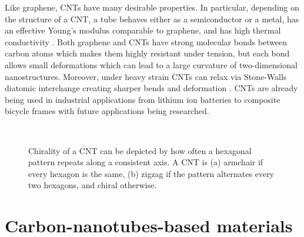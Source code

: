 	Like graphene, CNTs have many desirable properties. In particular, depending on the structure of a CNT, a tube behaves either as a semiconductor or a metal, has an effective Young's modulus comparable to graphene, and has high thermal conductivity \cite{Dresselhaus2004}. Both graphene and CNTs have strong molecular bonds between carbon atoms which makes them highly resistant under tension, but each bond allows small deformations which can lead to a large curvature of two-dimensional nanostructures. Moreover, under heavy strain CNTs can relax via Stone-Walls diatomic interchange creating sharper bends and deformation \cite{Yakobson1998}. CNTs are already being used in industrial applications from lithium ion batteries to composite bicycle frames \cite{De2013} with future applications being researched.
	
	\begin{figure}[t!]
		\centering
		\begin{subfigure}[t]{.5\textwidth}
			\centering
			
			\caption{\label{subfig:Armchair}}
		\end{subfigure}%
		~
		\begin{subfigure}[t]{.5\textwidth}
			\centering
			
			\caption{\label{subfig:Zigzag}}
		\end{subfigure}		
		\caption{Chirality of a CNT can be depicted by how often a hexagonal pattern repeats along a consistent axis. A CNT is (a) armchair if every hexagon is the same, (b) zigzag if the pattern alternates every two hexagons, and chiral otherwise.\label{fig:Chirality}}	
	\end{figure}
	
\section{Carbon-nanotubes-based materials}

